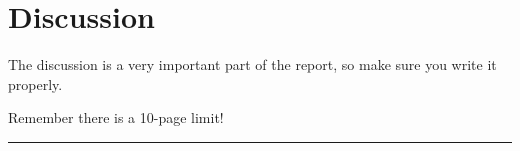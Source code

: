 \documentclass[twoside,twocolumn,10pt]{article}
\begin{document}

\section{Discussion}

The discussion is a very important part of the report, so make sure you write it properly.



 



\Large{Remember there is a 10-page limit!}
\hrule 
\appendix
\end{document}
